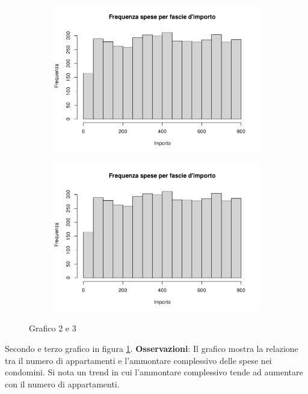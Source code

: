 \begin{figure}[h]
    \centering
    \begin{subfigure}[b]{0.5\textwidth}
        \centering
        \includegraphics[page=2,width=\textwidth]{../R/grafici.pdf}
    \end{subfigure}
    \hfill
    \begin{subfigure}[b]{0.5\textwidth}
        \centering
        \includegraphics[page=3,width=\textwidth]{../R/grafici.pdf}
    \end{subfigure}
    \caption{Grafico 2 e 3}
    \label{fig2}
\end{figure}

Secondo e terzo grafico in figura \ref{fig2}. \textbf{Osservazioni}: Il grafico mostra la relazione tra il numero di appartamenti e l'ammontare complessivo delle spese nei condomini. Si nota un trend in cui l'ammontare complessivo tende ad aumentare con il numero di appartamenti.


